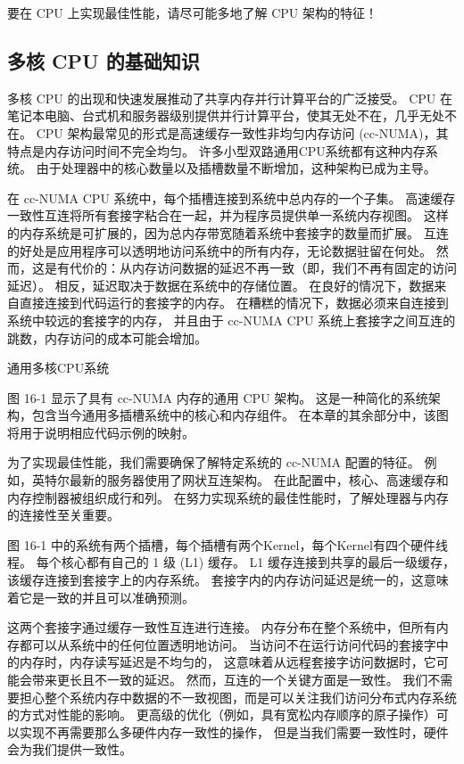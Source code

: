 \begin{remark}
	要在 CPU 上实现最佳性能，请尽可能多地了解 CPU 架构的特征！
\end{remark}

\subsection{多核 CPU 的基础知识}
多核 CPU 的出现和快速发展推动了共享内存并行计算平台的广泛接受。 
CPU 在笔记本电脑、台式机和服务器级别提供并行计算平台，使其无处不在，几乎无处不在。 
CPU 架构最常见的形式是高速缓存一致性非均匀内存访问 (cc-NUMA)，其特点是内存访问时间不完全均匀。 
许多小型双路通用CPU系统都有这种内存系统。 由于处理器中的核心数量以及插槽数量不断增加，这种架构已成为主导。

在 cc-NUMA CPU 系统中，每个插槽连接到系统中总内存的一个子集。 
高速缓存一致性互连将所有套接字粘合在一起，并为程序员提供单一系统内存视图。 
这样的内存系统是可扩展的，因为总内存带宽随着系统中套接字的数量而扩展。 
互连的好处是应用程序可以透明地访问系统中的所有内存，无论数据驻留在何处。 
然而，这是有代价的：从内存访问数据的延迟不再一致（即，我们不再有固定的访问延迟）。 
相反，延迟取决于数据在系统中的存储位置。 在良好的情况下，数据来自直接连接到代码运行的套接字的内存。 
在糟糕的情况下，数据必须来自连接到系统中较远的套接字的内存，
并且由于 cc-NUMA CPU 系统上套接字之间互连的跳数，内存访问的成本可能会增加。

{\color{red} 通用多核CPU系统}

图 16-1 显示了具有 cc-NUMA 内存的通用 CPU 架构。 
这是一种简化的系统架构，包含当今通用多插槽系统中的核心和内存组件。 
在本章的其余部分中，该图将用于说明相应代码示例的映射。

为了实现最佳性能，我们需要确保了解特定系统的 cc-NUMA 配置的特征。 
例如，英特尔最新的服务器使用了网状互连架构。 
在此配置中，核心、高速缓存和内存控制器被组织成行和列。 
在努力实现系统的最佳性能时，了解处理器与内存的连接性至关重要。

图 16-1 中的系统有两个插槽，每个插槽有两个Kernel，每个Kernel有四个硬件线程。 
每个核心都有自己的 1 级 (L1) 缓存。 L1 缓存连接到共享的最后一级缓存，该缓存连接到套接字上的内存系统。 
套接字内的内存访问延迟是统一的，这意味着它是一致的并且可以准确预测。

这两个套接字通过缓存一致性互连进行连接。 内存分布在整个系统中，但所有内存都可以从系统中的任何位置透明地访问。 
当访问不在运行访问代码的套接字中的内存时，内存读写延迟是不均匀的，
这意味着从远程套接字访问数据时，它可能会带来更长且不一致的延迟。 
然而，互连的一个关键方面是一致性。 
我们不需要担心整个系统内存中数据的不一致视图，而是可以关注我们访问分布式内存系统的方式对性能的影响。 
更高级的优化（例如，具有宽松内存顺序的原子操作）可以实现不再需要那么多硬件内存一致性的操作，
但是当我们需要一致性时，硬件会为我们提供一致性。

